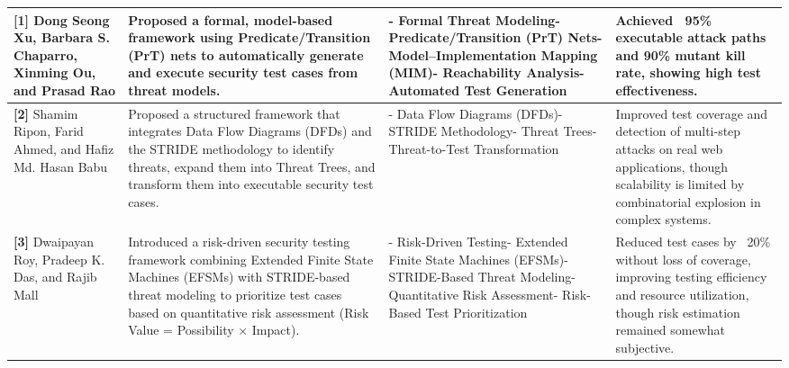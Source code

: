 \begin{scriptsize}
\begin{longtable}{|p{1.8cm}|p{4.2cm}|p{4.0cm}|p{3.8cm}|}
\textbf{[1]} Dong Seong Xu, Barbara S. Chaparro, Xinming Ou, and Prasad Rao & Proposed a formal, model-based framework using Predicate/Transition (PrT) nets to automatically generate and execute security test cases from threat models. & - Formal Threat Modeling\newline - Predicate/Transition (PrT) Nets\newline - Model--Implementation Mapping (MIM)\newline - Reachability Analysis\newline - Automated Test Generation & Achieved ~95\% executable attack paths and 90\% mutant kill rate, showing high test effectiveness. \\
\hline
\textbf{[2]} Shamim Ripon, Farid Ahmed, and Hafiz Md. Hasan Babu & Proposed a structured framework that integrates Data Flow Diagrams (DFDs) and the STRIDE methodology to identify threats, expand them into Threat Trees, and transform them into executable security test cases. & - Data Flow Diagrams (DFDs)\newline - STRIDE Methodology\newline - Threat Trees\newline - Threat-to-Test Transformation & Improved test coverage and detection of multi-step attacks on real web applications, though scalability is limited by combinatorial explosion in complex systems. \\
\hline
\textbf{[3]} Dwaipayan Roy, Pradeep K. Das, and Rajib Mall & Introduced a risk-driven security testing framework combining Extended Finite State Machines (EFSMs) with STRIDE-based threat modeling to prioritize test cases based on quantitative risk assessment (Risk Value = Possibility × Impact). & - Risk-Driven Testing\newline - Extended Finite State Machines (EFSMs)\newline - STRIDE-Based Threat Modeling\newline - Quantitative Risk Assessment\newline - Risk-Based Test Prioritization & Reduced test cases by ~20\% without loss of coverage, improving testing efficiency and resource utilization, though risk estimation remained somewhat subjective. \\
\hline

\end{longtable}
\end{scriptsize}

